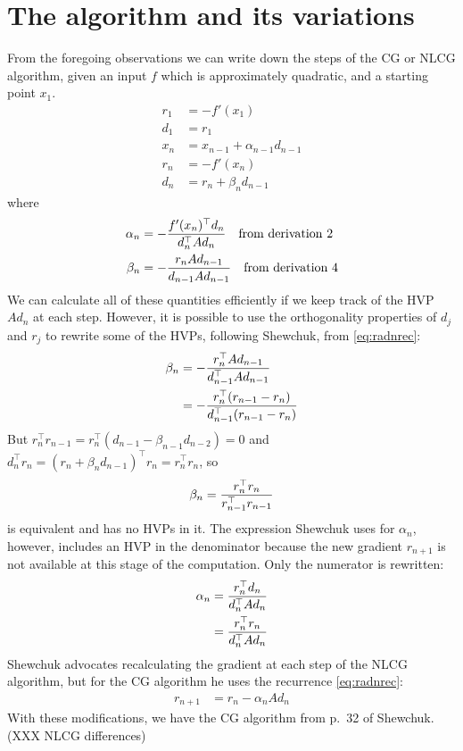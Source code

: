 \documentclass[11pt]{article}
\newcommand{\T}{\top}
\renewcommand{\(}{\left(}
\renewcommand{\)}{\right)}
\begin{document}
\section{The algorithm and its variations}

From the foregoing observations we can write down the steps of the CG
or NLCG algorithm, given an input $f$ which is approximately
quadratic, and a starting point $x_1$.
\begin{align}
r_1 &= -f'(x_1) \\
d_1 &= r_1 \\
x_n &= x_{n-1}+\alpha_{n-1}d_{n-1} \\
r_n &= -f'(x_n) \\
d_n &= r_n + \beta_n d_{n-1}
\end{align}
where
\begin{align}
\alpha_n &= -{f'(x_n)^\T d_n \over d_n^\T A d_n}
\textrm{\quad from derivation 2} \\
\beta_n &= -{r_n A d_{n-1} \over d_{n-1}A d_{n-1}}
\textrm{\quad from derivation 4} \\
\end{align}
We can calculate all of these quantities efficiently if we keep track
of the HVP $A d_n$ at each step. However, it is possible to use the
orthogonality properties of $d_j$ and $r_j$ to rewrite some of the
HVPs, following Shewchuk, from \ref{eq:radnrec}:
\begin{align}
\beta_n &= -{r_n^\T A d_{n-1} \over d_{n-1}^\T A d_{n-1}} \\
 &= -{r_n^\T (r_{n-1}-r_n) \over d_{n-1}^\T (r_{n-1}-r_n)}
\end{align}
But $r_n^\T r_{n-1} = r_n^\T(d_{n-1}-\beta_{n-1}d_{n-2}) = 0$ and
$d_n^\T r_n = (r_n + \beta_n d_{n-1})^\T r_n = r_n^\T r_n$, so
\begin{align}
\beta_n = {r_n^\T r_n \over r_{n-1}^\T r_{n-1}} \label{eq:r-beta}
\end{align}
is equivalent and has no HVPs in it. The expression Shewchuk uses for
$\alpha_n$, however, includes an HVP in the denominator because the
new gradient $r_{n+1}$ is not available at this stage of the
computation. Only the numerator is rewritten:
\begin{align}
\alpha_n &= {r_n^\T d_n \over d_n^\T A d_n} \\
&= {r_n^\T r_n \over d_n^\T A d_n}
\end{align}
Shewchuk advocates recalculating the gradient at each step of the NLCG
algorithm, but for the CG algorithm he uses the recurrence
\ref{eq:radnrec}:
\begin{align*}
r_{n+1} &= r_n - \alpha_n A d_n
\end{align*}
With these modifications, we have the CG algorithm from p.~32 of
Shewchuk. (XXX NLCG differences)
\end{document}
